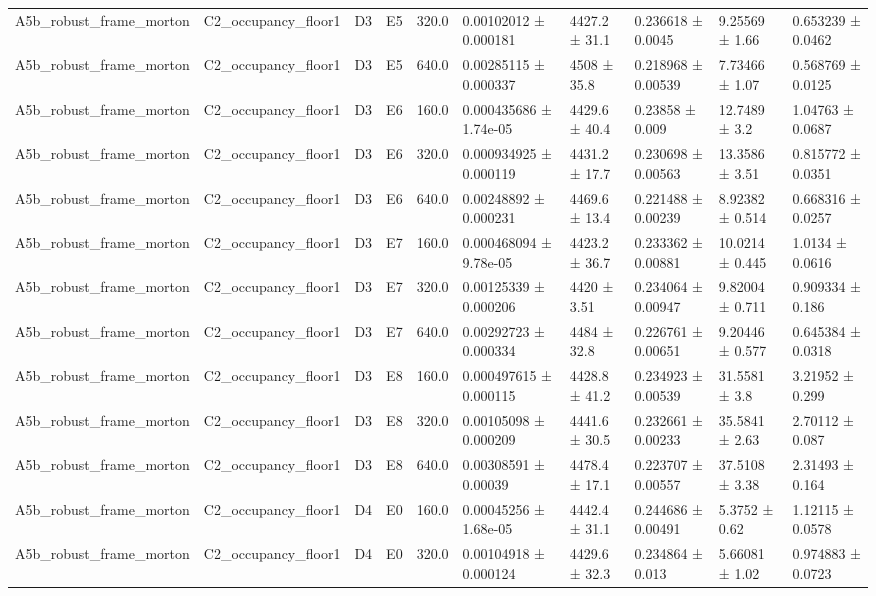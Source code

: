 \begin{table}
\begin{tabular}{llllllllll}
A5b\_robust\_frame\_morton & C2\_occupancy\_floor1 & D3 & E5 & 320.0 & 0.00102012 ± 0.000181 & 4427.2 ± 31.1 & 0.236618 ± 0.0045 & 9.25569 ± 1.66 & 0.653239 ± 0.0462 \\
A5b\_robust\_frame\_morton & C2\_occupancy\_floor1 & D3 & E5 & 640.0 & 0.00285115 ± 0.000337 & 4508 ± 35.8 & 0.218968 ± 0.00539 & 7.73466 ± 1.07 & 0.568769 ± 0.0125 \\
A5b\_robust\_frame\_morton & C2\_occupancy\_floor1 & D3 & E6 & 160.0 & 0.000435686 ± 1.74e-05 & 4429.6 ± 40.4 & 0.23858 ± 0.009 & 12.7489 ± 3.2 & 1.04763 ± 0.0687 \\
A5b\_robust\_frame\_morton & C2\_occupancy\_floor1 & D3 & E6 & 320.0 & 0.000934925 ± 0.000119 & 4431.2 ± 17.7 & 0.230698 ± 0.00563 & 13.3586 ± 3.51 & 0.815772 ± 0.0351 \\
A5b\_robust\_frame\_morton & C2\_occupancy\_floor1 & D3 & E6 & 640.0 & 0.00248892 ± 0.000231 & 4469.6 ± 13.4 & 0.221488 ± 0.00239 & 8.92382 ± 0.514 & 0.668316 ± 0.0257 \\
A5b\_robust\_frame\_morton & C2\_occupancy\_floor1 & D3 & E7 & 160.0 & 0.000468094 ± 9.78e-05 & 4423.2 ± 36.7 & 0.233362 ± 0.00881 & 10.0214 ± 0.445 & 1.0134 ± 0.0616 \\
A5b\_robust\_frame\_morton & C2\_occupancy\_floor1 & D3 & E7 & 320.0 & 0.00125339 ± 0.000206 & 4420 ± 3.51 & 0.234064 ± 0.00947 & 9.82004 ± 0.711 & 0.909334 ± 0.186 \\
A5b\_robust\_frame\_morton & C2\_occupancy\_floor1 & D3 & E7 & 640.0 & 0.00292723 ± 0.000334 & 4484 ± 32.8 & 0.226761 ± 0.00651 & 9.20446 ± 0.577 & 0.645384 ± 0.0318 \\
A5b\_robust\_frame\_morton & C2\_occupancy\_floor1 & D3 & E8 & 160.0 & 0.000497615 ± 0.000115 & 4428.8 ± 41.2 & 0.234923 ± 0.00539 & 31.5581 ± 3.8 & 3.21952 ± 0.299 \\
A5b\_robust\_frame\_morton & C2\_occupancy\_floor1 & D3 & E8 & 320.0 & 0.00105098 ± 0.000209 & 4441.6 ± 30.5 & 0.232661 ± 0.00233 & 35.5841 ± 2.63 & 2.70112 ± 0.087 \\
A5b\_robust\_frame\_morton & C2\_occupancy\_floor1 & D3 & E8 & 640.0 & 0.00308591 ± 0.00039 & 4478.4 ± 17.1 & 0.223707 ± 0.00557 & 37.5108 ± 3.38 & 2.31493 ± 0.164 \\
A5b\_robust\_frame\_morton & C2\_occupancy\_floor1 & D4 & E0 & 160.0 & 0.00045256 ± 1.68e-05 & 4442.4 ± 31.1 & 0.244686 ± 0.00491 & 5.3752 ± 0.62 & 1.12115 ± 0.0578 \\
A5b\_robust\_frame\_morton & C2\_occupancy\_floor1 & D4 & E0 & 320.0 & 0.00104918 ± 0.000124 & 4429.6 ± 32.3 & 0.234864 ± 0.013 & 5.66081 ± 1.02 & 0.974883 ± 0.0723 \\

\end{tabular}
\end{table}
